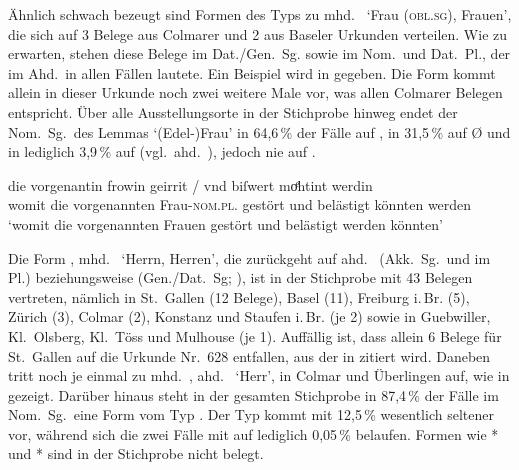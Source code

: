 Ähnlich schwach bezeugt sind Formen des Typs  zu
mhd.~ `Frau (\textsc{obl.sg}), Frauen', die sich auf 3 Belege aus
Colmarer und 2 aus Baseler Urkunden verteilen. Wie zu erwarten, stehen diese
Belege im Dat./Gen.~Sg. sowie im Nom.\ und Dat.~Pl., der im Ahd.\ in allen
Fällen  lautete. Ein Beispiel wird in 
gegeben. Die Form kommt allein in dieser Urkunde noch zwei weitere Male vor,
was allen Colmarer Belegen entspricht. Über alle Ausstellungsorte in der
Stichprobe hinweg endet der Nom.~Sg.\ des Lemmas  `(Edel-)Frau' in
64,6\,\% der Fälle auf , in 31,5\,\% auf Ø und in lediglich 3,9\,\% auf
 (vgl.~ahd.~), jedoch nie auf .

\begin{exe}
\ex\label{ex:col_vrouwin}
	 die vorgenantin frowin geirrit / vnd biſwert moͤhtint
			werdin \\
		womit die vorgenannten Frau-\textsc{nom.pl.\FemF} gestört {} und
			belästigt könnten werden \\
	\trans `womit die vorgenannten Frauen gestört und belästigt werden
		könnten'
		\parencites(Nr.~3293, Colmar, 1299)[446,24]{cao4}
\end{exe}

Die Form , mhd.~ `Herrn, Herren', die zurückgeht auf
ahd.~ (Akk.~Sg.\ und im Pl.) beziehungsweise
 (Gen./Dat.~Sg; \cite[vgl.][282--283]{braune2018}), ist in der
Stichprobe mit 43 Belegen vertreten, nämlich in St.~Gallen (12 Belege), Basel
(11), Freiburg i.\,Br. (5), Zürich (3), Colmar (2), Konstanz und Staufen
i.\,Br. (je 2) sowie in Guebwiller, Kl.~Olsberg, Kl.~Töss und Mulhouse (je 1).
Auffällig ist, dass allein 6 Belege für St.~Gallen auf die Urkunde Nr.~628
\autocite[55,35--57,7]{cao2} entfallen, aus der in  zitiert
wird. Daneben tritt noch je einmal  zu mhd.~,
ahd.~ `Herr', in Colmar und Überlingen auf, wie in
 gezeigt. Darüber hinaus steht in der gesamten Stichprobe in
87,4\,\% der Fälle im Nom.~Sg.\ eine Form vom Typ . Der Typ
 kommt mit 12,5\,\% wesentlich seltener vor, während sich die zwei
Fälle mit  auf lediglich 0,05\,\% belaufen. Formen wie *
und * sind in der Stichprobe nicht belegt.

